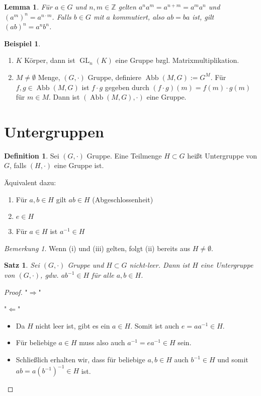 \documentclass[12pt]{scrartcl} %
\DeclareMathOperator{\GL}{GL}
\DeclareMathOperator{\abb}{Abb}
\newcommand{\Inv}[1]{#1^{-1}}
\newtheorem{thm}{Satz}
\newtheorem{lemma}{Lemma}
\theoremstyle{definition}
\newtheorem*{defn}{Definition}
\newtheorem{ex}{Beispiel}
\theoremstyle{remark}
\newtheorem*{nb}{Bemerkung}
\begin{document}
\begin{lemma}
	Für $a\in G$ und \(n, m \in\mathbb Z\) gelten $a^n a^m=a^{n+m}=a^m a^n$ und $\left(a^m \right)^n = a^{n\cdot m}$.
	Falls \(b \in G\) mit \(a\) kommutiert, also $ab=ba$ ist, gilt $\left(ab \right)^n = a^n b^n$.
\end{lemma}

\begin{ex}
	\begin{enumerate}
	\item $K$ Körper, dann ist $\GL_n(K)$ eine Gruppe bzgl. Matrixmultiplikation.
	\item $M\neq \emptyset$ Menge, $(G, \cdot)$ Gruppe, definiere $\abb(M,G):=G^M$.
		Für $f,g\in \abb(M,G)$ ist $f\cdot g$ gegeben durch $(f\cdot g)(m)=f(m)\cdot g(m)$ für $m\in M$.
		Dann ist $(\abb(M,G), \cdot)$ eine Gruppe.
	\end{enumerate}
\end{ex}

\section{Untergruppen}

\begin{defn}
	Sei $(G, \cdot)$ Gruppe.
	Eine Teilmenge $H\subset G$ heißt Untergruppe von $G$, falls $(H, \cdot)$ eine Gruppe ist.

	Äquivalent dazu:
	\begin{enumerate}[label=(\roman*)]
	\item Für $a,b\in H$ gilt $ab\in H$ (Abgeschlossenheit)
	\item $e\in H$
	\item Für $a\in H$ ist $\Inv a \in H$
	\end{enumerate}
\end{defn}

\begin{nb}
	Wenn (i) und (iii) gelten, folgt (ii) bereits aus \(H \neq \emptyset\).
\end{nb}

\begin{thm}
	Sei $(G, \cdot)$ Gruppe und $H\subset G$ nicht-leer.
	Dann ist $H$ eine Untergruppe von $(G, \cdot)$, gdw. $a\Inv b\in H$ für alle $a,b\in H$.
\end{thm}

\begin{proof}
	"$\Rightarrow$" \checkmark

	"$\Leftarrow$"
	\begin{itemize}
	\item Da \(H\) nicht leer ist, gibt es ein \(a \in H\).
		Somit ist auch $e = aa^{-1}\in H$.
	\item Für beliebige \(a \in H\) muss also auch \(a^{-1} = ea^{-1} \in H\) sein.
	\item Schließlich erhalten wir, dass für beliebige \(a, b \in H\) auch \(b^{-1} \in H\) und somit \(ab = a(b^{-1})^{-1} \in H\) ist. \qedhere
	\end{itemize}
\end{proof}
\end{document}
